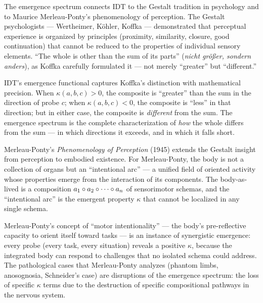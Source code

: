 \begin{interpretation}
\label{interp:ch19:gestalt_merleau_ponty}
The emergence spectrum connects IDT to the Gestalt tradition in psychology
and to Maurice Merleau-Ponty's phenomenology of perception.  The Gestalt
psychologists --- Wertheimer, K\"ohler, Koffka --- demonstrated that
perceptual experience is organized by principles (proximity, similarity,
closure, good continuation) that cannot be reduced to the properties of
individual sensory elements.  ``The whole is other than the sum of its
parts'' (\textit{nicht gr\"o\ss er, sondern anders}), as Koffka carefully
formulated it --- not merely ``greater'' but ``different.''

IDT's emergence functional captures Koffka's distinction with mathematical
precision.  When $\kappa(a, b, c) > 0$, the composite is ``greater'' than
the sum in the direction of probe $c$; when $\kappa(a, b, c) < 0$, the
composite is ``less'' in that direction; but in either case, the composite
is \emph{different} from the sum.  The emergence spectrum is the complete
characterization of \emph{how} the whole differs from the sum --- in which
directions it exceeds, and in which it falls short.

Merleau-Ponty's \textit{Phenomenology of Perception} (1945) extends the
Gestalt insight from perception to embodied existence.  For Merleau-Ponty,
the body is not a collection of organs but an ``intentional arc'' ---
a unified field of oriented activity whose properties emerge from the
interaction of its components.  The body-as-lived is a composition
$a_1 \circ a_2 \circ \cdots \circ a_n$ of sensorimotor schemas,
and the ``intentional arc'' is the emergent property $\kappa$ that cannot
be localized in any single schema.

Merleau-Ponty's concept of ``motor intentionality'' --- the body's
pre-reflective capacity to orient itself toward tasks --- is an
instance of synergistic emergence: every probe (every task, every
situation) reveals a positive $\kappa$, because the integrated body
can respond to challenges that no isolated schema could address.  The
pathological cases that Merleau-Ponty analyzes (phantom limbs, anosognosia,
Schneider's case) are disruptions of the emergence spectrum: the loss
of specific $\kappa$ terms due to the destruction of specific
compositional pathways in the nervous system.
\end{interpretation}

